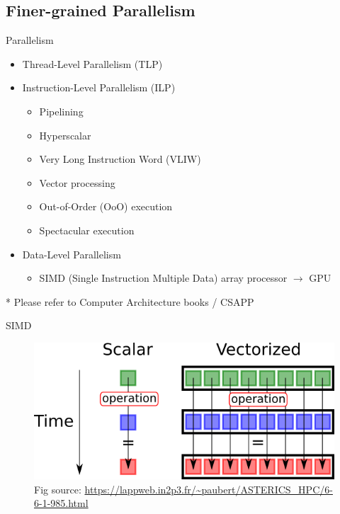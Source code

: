 \documentclass{../TexTemplate/myslide}
\begin{document}
\subsection{Finer-grained Parallelism}
\begin{frame}
\subsectionpage
\end{frame}

\begin{frame}{Parallelism}
\begin{itemize}
	\item Thread-Level Parallelism (TLP)
	\item Instruction-Level Parallelism (ILP)
	\begin{itemize}
		\item Pipelining
		\item Hyperscalar
		\item Very Long Instruction Word (VLIW)
		\item Vector processing
		\item Out-of-Order (OoO) execution
		\item Spectacular execution
	\end{itemize}
	\item Data-Level Parallelism
	\begin{itemize}
		\item SIMD (Single Instruction Multiple Data) array processor $\to$ GPU
	\end{itemize}
\end{itemize}
* Please refer to Computer Architecture books / CSAPP
\end{frame}

\begin{frame}{SIMD}
\begin{figure}
\centering
\includegraphics[width=0.8\linewidth]{fig/vectorization.png}
\caption*{\small Fig source: \url{https://lappweb.in2p3.fr/~paubert/ASTERICS_HPC/6-6-1-985.html}}
\end{figure}
\end{frame}
\end{document}
